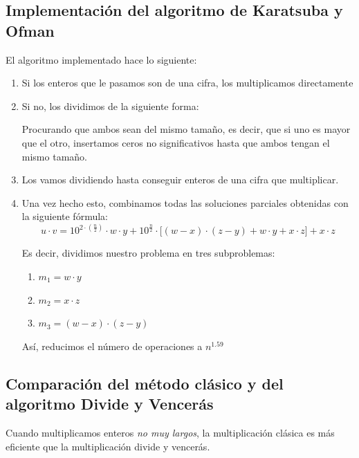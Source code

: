 \documentclass[10pt,a4paper,spanish]{report}
\begin{document}
\subsection{\textcolor[rgb]{0.7,0.2,0.4}Implementación del algoritmo de Karatsuba y Ofman}
El algoritmo implementado hace lo siguiente:
\begin{enumerate}
  \item Si los enteros que le pasamos son de una cifra, los multiplicamos directamente
  \item Si no, los dividimos de la siguiente forma:
  \begin{center}
  
  \end{center}
  Procurando que ambos sean del mismo tamaño, es decir, que si uno es mayor que el otro, insertamos ceros no significativos hasta que ambos tengan el mismo tamaño.
  \item Los vamos dividiendo hasta conseguir enteros de una cifra que multiplicar.
  \item Una vez hecho esto, combinamos todas las soluciones parciales obtenidas con la siguiente fórmula:
  \begin{displaymath}
  u \cdot v = 10^{2 \cdot (\frac{n}{2})} \cdot w \cdot y + 10^{\frac{n}{2}} \cdot \Big[ (w-x) \cdot (z-y) + w \cdot y + x \cdot z \Big] + x \cdot z
  \end{displaymath}

  Es decir, dividimos nuestro problema en tres subproblemas:
  \begin{enumerate}[\color{amaranth}{$\heartsuit$}]
    \item $m_1 = w \cdot y$
    \item $m_2 = x \cdot z$
    \item $m_3 = (w-x) \cdot (z-y)$
  \end{enumerate}

  Así, reducimos el número de operaciones a $n^{1.59}$
\end{enumerate}


\subsection{\textcolor[rgb]{0.51,0.28,0.47}Comparación del método clásico y del algoritmo Divide y Vencerás}
Cuando multiplicamos enteros \textit{\textcolor[rgb]{0.51,0.28,0.47}{no muy largos}}, la multiplicación clásica es más eficiente que la multiplicación divide y vencerás.
\end{document}
